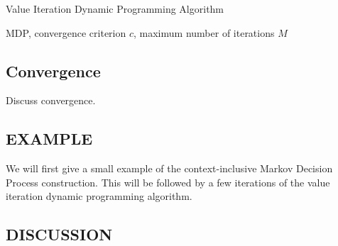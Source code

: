 \documentclass[]{article}
\begin{document}
\begin{algorithm}
\caption{Value Iteration Dynamic Programming Algorithm}
\label{alg:value-iteration-dynamic}
\begin{algorithmic}[1]
\REQUIRE MDP, convergence criterion $c$, maximum number of iterations $M$
        \ENDIF
    \ENDFOR
        \ENDIF
    \ENDIF
\ENDFOR
\end{algorithmic}
\end{algorithm}


\subsection{Convergence} Discuss convergence.

\subsection{EXAMPLE}

We will first give a small example of the context-inclusive Markov Decision Process construction. This will be followed by a few iterations of the value iteration dynamic programming algorithm.





\subsection{DISCUSSION}
\end{document}
